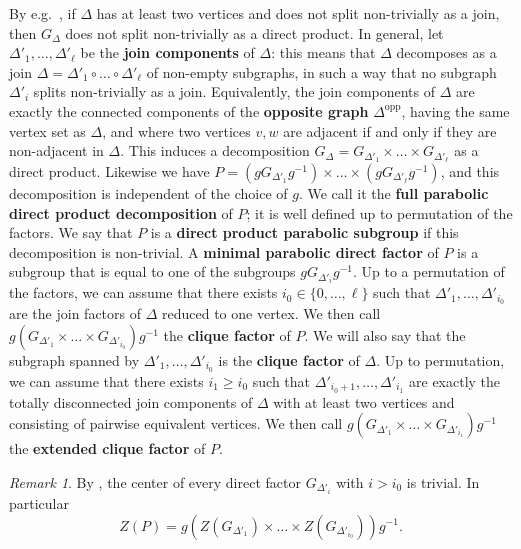 \documentclass[a4paper,english,11pt]{article}
\theoremstyle{definition}
\theoremstyle{remark}
\newtheorem{rk}[de]{Remark}
\newcommand{\deffont}[1]{\textbf{#1}}
\begin{document}
By e.g.\ \cite[Proposition~2.8]{Gen}, if $\Delta$ has at least two vertices and does not split non-trivially as a join, then $G_{\Delta}$ does not split non-trivially as a direct product. 
In general, let $\Delta'_1,\dots,\Delta'_\ell$ be the \deffont{join components} of $\Delta$: this means that $\Delta$ decomposes as a join $\Delta=\Delta'_1\circ\dots\circ\Delta'_\ell$ of non-empty subgraphs, in such a way that no subgraph $\Delta'_i$ splits non-trivially as a join. Equivalently, the join components of $\Delta$ are exactly the connected components of the \deffont{opposite graph} $\Delta^{\mathrm{opp}}$, having the same vertex set as $\Delta$, and where two vertices $v,w$ are adjacent if and only if they are non-adjacent in $\Delta$. This induces a decomposition $G_\Delta=G_{\Delta'_1}\times\dots\times G_{\Delta'_\ell}$ as a direct product.  Likewise we have $P=(gG_{\Delta'_1}g^{-1}) \times \dots \times (gG_{\Delta'_\ell}g^{-1})$, and this decomposition is independent of the choice of $g$. We call it the \deffont{full parabolic direct product decomposition} of $P$; it is well defined up to permutation of the factors. We say that $P$ is a \deffont{direct product parabolic subgroup} if this decomposition is non-trivial. A \deffont{minimal parabolic direct factor} of $P$ is a subgroup that is equal to one of the subgroups $gG_{\Delta'_i}g^{-1}$. Up to a permutation of the factors, we can assume that there exists $i_0\in\{0,\dots,\ell\}$ such that $\Delta'_1,\dots,\Delta'_{i_0}$ are the join factors of $\Delta$ reduced to one vertex. We then call $g(G_{\Delta'_1}\times\dots\times G_{\Delta'_{i_0}})g^{-1}$ the \label{de:clique}\deffont{clique factor} of $P$. We will also say that the subgraph spanned by $\Delta'_1,\dots,\Delta'_{i_0}$ is the \deffont{clique factor} of $\Delta$. Up to permutation, we can assume that there exists $i_1\ge i_0$ such that $\Delta'_{i_0+1},\dots,\Delta'_{i_1}$ are exactly the totally disconnected join components of $\Delta$ with at least two vertices and consisting of pairwise equivalent vertices. We then call $g(G_{\Delta'_1}\times\dots\times G_{\Delta'_{i_1}})g^{-1}$ the \deffont{extended clique factor}\label{de:extended-clique-factor} of $P$.

\begin{rk}\label{rk:center}
By \cite[Theorem~3.34]{Gre}, the center of every direct factor $G_{\Delta'_i}$ with $i>i_0$ is trivial. In particular 
\begin{equation*}
    Z(P)=g\left(Z\left(G_{\Delta'_1}\right)\times\dots\times Z\left(G_{\Delta'_{i_0}}\right)\right)g^{-1}.
\end{equation*}
\end{rk}
\end{document}
